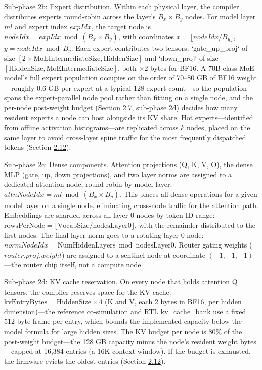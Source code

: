 \documentclass[10pt,twocolumn]{article}
\begin{document}
Sub-phase 2b: Expert distribution. Within each physical layer, the compiler distributes experts round-robin across the layer's $B_x \times B_y$ nodes. For model layer $ml$ and expert index $expIdx$, the target node is $nodeIdx = expIdx \bmod (B_x \times B_y)$, with coordinates $x = \lfloor nodeIdx / B_y \rfloor$, $y = nodeIdx \bmod B_y$. Each expert contributes two tensors: `gate\_up\_proj` of size $[2 \times \mathrm{MoEIntermediateSize}, \mathrm{HiddenSize}]$ and `down\_proj` of size $[\mathrm{HiddenSize}, \mathrm{MoEIntermediateSize}]$, both $\times 2$ bytes for BF16. A 70B-class MoE model's full expert population occupies on the order of 70--80 GB of BF16 weight---roughly 0.6 GB per expert at a typical 128-expert count---so the population spans the expert-parallel node pool rather than fitting on a single node, and the per-node post-weight budget (Section \hyperref[sec:2.7]{2.7}, sub-phase 2d) decides how many resident experts a node can host alongside its KV share. Hot experts---identified from offline activation histograms---are replicated across $k$ nodes, placed on the same layer to avoid cross-layer spine traffic for the most frequently dispatched tokens (Section \hyperref[sec:2.12]{2.12}).

Sub-phase 2c: Dense components. Attention projections (Q, K, V, O), the dense MLP (gate, up, down projections), and two layer norms are assigned to a dedicated attention node, round-robin by model layer: $attnNodeIdx = ml \bmod (B_x \times B_y)$. This places all dense operations for a given model layer on a single node, eliminating cross-node traffic for the attention path. Embeddings are sharded across all layer-0 nodes by token-ID range: $\mathrm{rowsPerNode} = \lfloor \mathrm{VocabSize} / \mathrm{nodesLayer0} \rfloor$, with the remainder distributed to the first nodes. The final layer norm goes to a rotating layer-0 node: $normNodeIdx = \mathrm{NumHiddenLayers} \bmod \mathrm{nodesLayer0}$. Router gating weights ($router.proj.weight$) are assigned to a sentinel node at coordinate $(-1, -1, -1)$---the router chip itself, not a compute node.

Sub-phase 2d: KV cache reservation. On every node that holds attention Q tensors, the compiler reserves space for the KV cache: $\mathrm{kvEntryBytes} = \mathrm{HiddenSize} \times 4$ (K and V, each 2 bytes in BF16, per hidden dimension)---the reference co-simulation and RTL kv\_cache\_bank use a fixed 512-byte frame per entry, which bounds the implemented capacity below the model formula for large hidden sizes. The KV budget per node is 80\% of the post-weight budget---the 128 GB capacity minus the node's resident weight bytes---capped at 16,384 entries (a 16K context window). If the budget is exhausted, the firmware evicts the oldest entries (Section \hyperref[sec:2.12]{2.12}).
\end{document}
